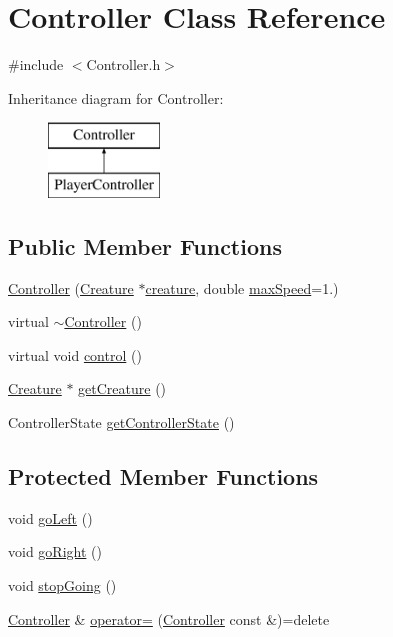 \hypertarget{class_controller}{}\section{Controller Class Reference}
\label{class_controller}


{\ttfamily \#include $<$Controller.\+h$>$}

Inheritance diagram for Controller\+:\begin{figure}[H]
\begin{center}
\leavevmode
\includegraphics[height=2.000000cm]{class_controller}
\end{center}
\end{figure}
\subsection*{Public Member Functions}
\begin{DoxyCompactItemize}
\item 
\hyperlink{class_controller_a0153b917395932c35fedd3a39ad98a35}{Controller} (\hyperlink{class_creature}{Creature} $\ast$\hyperlink{class_controller_a54982a6e6ceaafdd59d72ddd7df013a1}{creature}, double \hyperlink{class_controller_ac16d67602af82582f06ffeaf35fa9337}{max\+Speed}=1.)
\item 
virtual \hyperlink{class_controller_a0ab87934c4f7a266cfdb86e0f36bc1b5}{$\sim$\+Controller} ()
\item 
virtual void \hyperlink{class_controller_a018a5dbae5b2f28fd65a4ebfa1c1ba13}{control} ()
\item 
\hyperlink{class_creature}{Creature} $\ast$ \hyperlink{class_controller_a3bcad387f18cbd9270a6fc76ee310118}{get\+Creature} ()
\item 
Controller\+State \hyperlink{class_controller_a8d8b63439afced3d1743e957c4d239fd}{get\+Controller\+State} ()
\end{DoxyCompactItemize}
\subsection*{Protected Member Functions}
\begin{DoxyCompactItemize}
\item 
void \hyperlink{class_controller_a79faaf34a18f047a0be45a89c0dc3c09}{go\+Left} ()
\item 
void \hyperlink{class_controller_ad388f36ef903a876370e4ec9b3bae840}{go\+Right} ()
\item 
void \hyperlink{class_controller_a64661c1d8dd429a69fca4b619b0e7a9e}{stop\+Going} ()
\item 
\hyperlink{class_controller}{Controller} \& \hyperlink{class_controller_af62599f482a8a4faf9e73429c7b1e768}{operator=} (\hyperlink{class_controller}{Controller} const \&)=delete
\end{DoxyCompactItemize}
